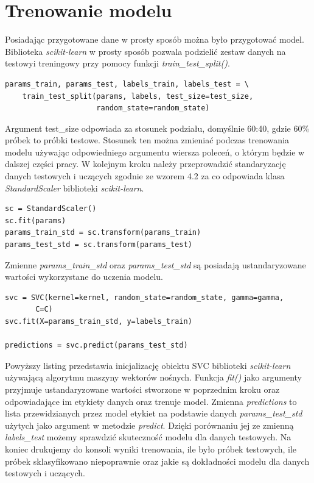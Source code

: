 \documentclass[printmode, eng]{mgr}
\newcommand\tab[1][1cm]{\hspace*{#1}}
\begin{document}
\section{Trenowanie modelu}
\tab Posiadając przygotowane dane w prosty sposób można było przygotować model. Biblioteka \textit{scikit-learn} w prosty sposób pozwala podzielić zestaw danych na testowy\linebreak i treningowy przy pomocy funkcji \textit{train\_test\_split()}.
\begin{lstlisting}
params_train, params_test, labels_train, labels_test = \
    train_test_split(params, labels, test_size=test_size,
                     random_state=random_state)
\end{lstlisting}
\tab Argument test\_size odpowiada za stosunek podziału, domyślnie 60:40, gdzie 60\% próbek to próbki testowe. Stosunek ten można zmieniać podczas trenowania modelu używając odpowiedniego argumentu wiersza poleceń, o którym będzie w dalszej części pracy. W kolejnym kroku należy przeprowadzić standaryzację danych testowych i uczących zgodnie ze wzorem 4.2 za co odpowiada klasa \textit{StandardScaler} biblioteki \textit{scikit-learn}.
\begin{lstlisting}
sc = StandardScaler()
sc.fit(params)
params_train_std = sc.transform(params_train)
params_test_std = sc.transform(params_test)
\end{lstlisting}
\tab Zmienne \textit{params\_train\_std} oraz \textit{params\_test\_std} są posiadają ustandaryzowane wartości wykorzystane do uczenia modelu.

\begin{lstlisting}
svc = SVC(kernel=kernel, random_state=random_state, gamma=gamma,
  	   C=C)
svc.fit(X=params_train_std, y=labels_train)
    
predictions = svc.predict(params_test_std)
\end{lstlisting}
\tab Powyższy listing przedstawia inicjalizację obiektu SVC biblioteki \textit{scikit-learn} używającą algorytmu maszyny wektorów nośnych. Funkcja \textit{fit()} jako argumenty przyjmuje ustandaryzowane wartości stworzone w poprzednim kroku oraz odpowiadające im etykiety danych oraz trenuje model. Zmienna \textit{predictions} to lista przewidzianych przez model etykiet na podstawie danych \textit{params\_test\_std} użytych jako argument w metodzie \textit{predict}. Dzięki porównaniu jej ze zmienną \textit{labels\_test} możemy sprawdzić skuteczność modelu dla danych testowych. Na koniec drukujemy do konsoli wyniki trenowania, ile było próbek testowych, ile próbek sklasyfikowano niepoprawnie oraz jakie są dokładności modelu dla danych testowych i uczących.
\end{document}
